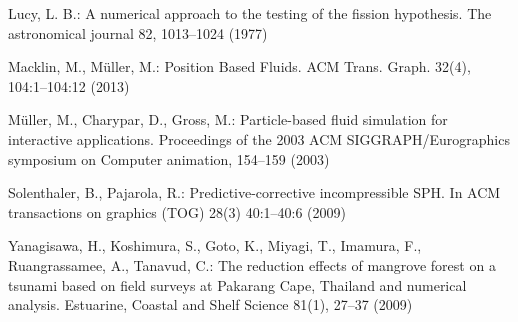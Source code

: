 \documentclass{llncs}
\begin{document}
\begin{thebibliography}{14}
 Lucy, L. B.: A numerical approach to the testing of the fission
  hypothesis. The astronomical journal 82, 1013--1024 (1977)

 Macklin, M., M\"{u}ller, M.: Position Based Fluids. ACM
Trans. Graph. 32(4), 104:1--104:12 (2013)

 M\"{u}ller, M., Charypar, D., Gross, M.: Particle-based fluid
  simulation for interactive applications. Proceedings of the 2003 ACM
  SIGGRAPH/Eurographics symposium on Computer animation, 154--159 (2003)

 Solenthaler, B., Pajarola, R.: Predictive-corrective
  incompressible SPH. In ACM transactions on graphics (TOG) 28(3) 40:1--40:6 (2009)

 Yanagisawa, H., Koshimura, S., Goto, K., Miyagi, T., Imamura,
  F., Ruangrassamee, A., Tanavud, C.: The reduction effects of mangrove forest on a
  tsunami based on field surveys at Pakarang Cape, Thailand and numerical
  analysis. Estuarine, Coastal and Shelf Science 81(1), 27--37 (2009)

\end{thebibliography}
\end{document}
